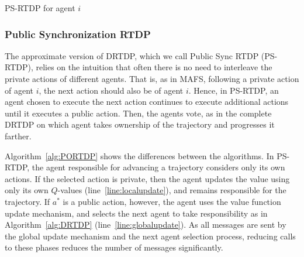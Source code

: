 \documentclass[letterpaper]{article} %
\theoremstyle{remark}
\begin{document}
\begin{algorithm}[t!]
\footnotesize
\caption{PS-RTDP for agent $i$}
\label{alg:PORTDP}

\end{algorithm}




\subsubsection{Public Synchronization RTDP}

The approximate version of DRTDP, which we call Public Sync RTDP (PS-RTDP), relies on the intuition that often there is no need to interleave the private actions of different agents. That is, as in MAFS, following a private action of agent $i$, the next action should also be of agent $i$.
Hence, in PS-RTDP, an agent chosen to execute the next action continues to execute additional actions until it executes a public action. Then, the agents vote, as in the complete DRTDP on which agent takes ownership of the trajectory and progresses it farther.

\vspace{-4.93mm}
Algorithm~\ref{alg:PORTDP} shows the differences between the algorithms. In PS-RTDP, the agent responsible for advancing a trajectory considers only its own actions. If the selected action is private, then the agent updates the value using only its own $Q$-values (line~\ref{line:localupdate}), and remains responsible for the trajectory. If $a^*$ is a public action, however, the agent uses the value function update mechanism, and selects the next agent to take responsibility as in Algorithm~\ref{alg:DRTDP} (line~\ref{line:globalupdate}).  As all messages are sent by the global update mechanism and the next agent selection process, reducing calls to these phases reduces the number of messages significantly.
\end{document}
